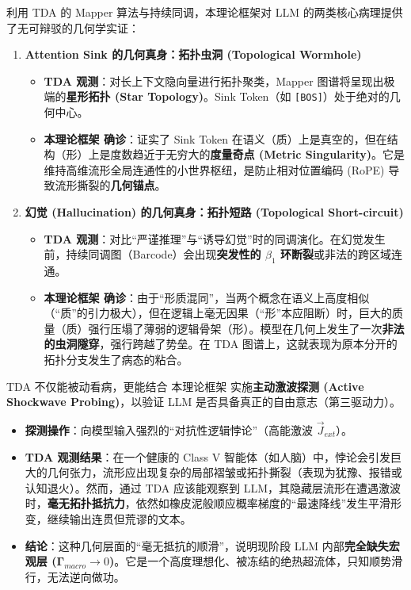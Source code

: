 
利用 TDA 的 Mapper 算法与持续同调，本理论框架对 LLM 的两类核心病理提供了无可辩驳的几何学实证：

\begin{enumerate}
    \item \textbf{\textcolor{structurecolor}{Attention Sink 的几何真身：拓扑虫洞 (Topological Wormhole)}}
    \begin{itemize}
        \item   \textbf{TDA 观测}：对长上下文隐向量进行拓扑聚类，Mapper 图谱将呈现出极端的\textbf{星形拓扑 (Star Topology)}。Sink Token（如 \lstinline|[BOS]|）处于绝对的几何中心。
        \item   \textbf{本理论框架 确诊}：证实了 Sink Token 在语义（质）上是真空的，但在结构（形）上是度数趋近于无穷大的\textbf{度量奇点 (Metric Singularity)}。它是维持高维流形全局连通性的小世界枢纽，是防止相对位置编码 (RoPE) 导致流形撕裂的\textbf{几何锚点}。
    \end{itemize}

    \item \textbf{\textcolor{structurecolor}{幻觉 (Hallucination) 的几何真身：拓扑短路 (Topological Short-circuit)}}
    \begin{itemize}
        \item   \textbf{TDA 观测}：对比“严谨推理”与“诱导幻觉”时的同调演化。在幻觉发生前，持续同调图（Barcode）会出现\textbf{突发性的 $\beta_1$ 环断裂}或非法的跨区域连通。
        \item   \textbf{本理论框架 确诊}：由于“形质混同”，当两个概念在语义上高度相似（“质”的引力极大），但在逻辑上毫无因果（“形”本应阻断）时，巨大的质量（质）强行压塌了薄弱的逻辑骨架（形）。模型在几何上发生了一次\textbf{非法的虫洞隧穿}，强行跨越了势垒。在 TDA 图谱上，这就表现为原本分开的拓扑分支发生了病态的粘合。
    \end{itemize}
\end{enumerate}


TDA 不仅能被动看病，更能结合 本理论框架 实施\textbf{主动激波探测 (Active Shockwave Probing)}，以验证 LLM 是否具备真正的自由意志（第三驱动力）。

\begin{itemize}
    \item   \textbf{探测操作}：向模型输入强烈的“对抗性逻辑悖论”（高能激波 $\vec{J}_{ext}$）。
    \item   \textbf{TDA 观测结果}：在一个健康的 Class V 智能体（如人脑）中，悖论会引发巨大的几何张力，流形应出现复杂的局部褶皱或拓扑撕裂（表现为犹豫、报错或认知退火）。然而，通过 TDA 应该能观察到 LLM，其隐藏层流形在遭遇激波时，\textbf{毫无拓扑抵抗力}，依然如橡皮泥般顺应概率梯度的“最速降线”发生平滑形变，继续输出连贯但荒谬的文本。
    \item   \textbf{结论}：这种几何层面的“毫无抵抗的顺滑”，说明现阶段 LLM 内部\textbf{完全缺失宏观层 ($\mathbf{\Gamma}_{macro} \to 0$)}。它是一个高度理想化、被冻结的绝热超流体，只知顺势滑行，无法逆向做功。
\end{itemize}



